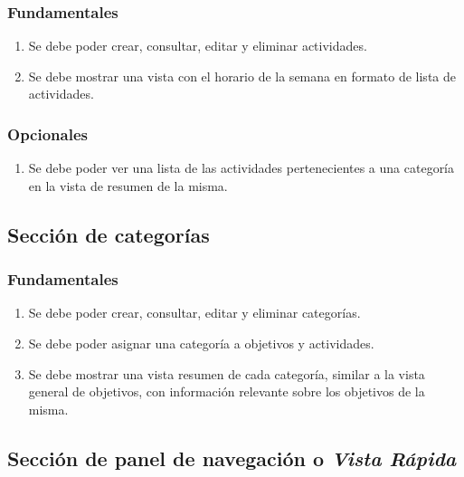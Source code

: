 \documentclass[10pt, a4paper]{aqademic}
\begin{document}
\subsubsection*{Fundamentales}

\begin{enumerate}[resume]
	\item Se debe poder crear, consultar, editar y eliminar actividades.
	
	\item Se debe mostrar una vista con el horario de la semana en formato de lista de actividades.
\end{enumerate}

\subsubsection*{Opcionales}

\begin{enumerate}[resume]
	\item Se debe poder ver una lista de las actividades pertenecientes a una categoría en la vista de resumen de la misma.
\end{enumerate}


\subsection*{Sección de categorías}

\subsubsection*{Fundamentales}

\begin{enumerate}[resume]
	\item Se debe poder crear, consultar, editar y eliminar categorías.
	
	\item Se debe poder asignar una categoría a objetivos y actividades.
	
	\item Se debe mostrar una vista resumen de cada categoría, similar a la vista general de objetivos, con información relevante sobre los objetivos de la misma.
\end{enumerate}


\subsection*{Sección de panel de navegación o \textit{Vista Rápida}}
\end{document}
